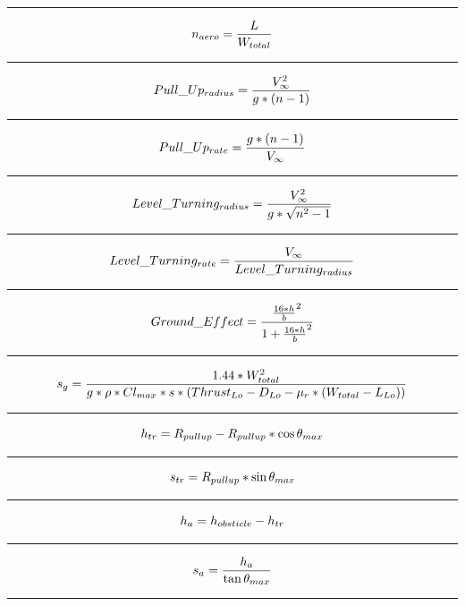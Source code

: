 \documentclass[12pt,A4paper]{article}
\begin{document}
	\hrule
	\vspace{0.1 in}
	\begin{equation}
		n_{aero} = \frac{L}{W_{total}} \\
	\end{equation}
	\hrule
	\vspace{0.1 in}
	\begin{equation}
		Pull\_Up_{radius} = \frac{V_\infty^2}{g*(n-1)} \\
	\end{equation}
	\hrule
	\vspace{0.1 in}
	\begin{equation}
		Pull\_Up_{rate} = \frac{g*(n-1)}{V_\infty} \\
	\end{equation}
	\hrule
	\vspace{0.1 in}
	\vspace{0.1 in}
	\begin{equation}
		Level\_Turning_{radius} = \frac{V_\infty^2}{g*\sqrt{n^2-1}} \\
	\end{equation}
	\hrule
	\vspace{0.1 in}
	\begin{equation}
		Level\_Turning_{rate} = \frac{V_\infty}{Level\_Turning_{radius}} \\
	\end{equation}
	\hrule
	\vspace{0.1 in}
	\begin{equation}
		Ground\_Effect = \frac{{\frac{16 * h}{b}}^2}{1+{\frac{16 * h}{b}}^2} \\
	\end{equation}
	\hrule
	\vspace{0.1 in}
	\begin{equation}
		s_g = \frac{1.44*W_{total}^2}{g*\rho*Cl_{max}* s * (Thrust_{Lo} - D_{Lo} - \mu_r*(W_{total}-L_{Lo}))} \\
	\end{equation}
	\hrule
	\vspace{0.1 in}
	\begin{equation}
		h_{tr} = R_{pullup} - R_{pullup} * \cos{\theta_{max}} \\
	\end{equation}
	\hrule
	\vspace{0.1 in}
	\begin{equation}
		s_{tr} = R_{pullup} * \sin{\theta_{max}} \\
	\end{equation}
	\hrule
	\vspace{0.1 in}
	\begin{equation}
		h_a = h_{obsticle} - h_{tr} \\
	\end{equation}
	\hrule
	\vspace{0.1 in}
	\begin{equation}
		s_a = \frac{h_a}{\tan{\theta_{max}}} \\
	\end{equation}
	\hrule
	\vspace{0.1 in}
\end{document}
